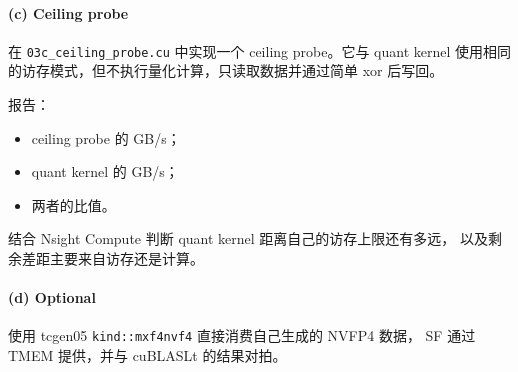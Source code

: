 \documentclass[11pt,a4paper,fontset=fandol]{ctexart}
\providecommand{\tightlist}{\setlength{\itemsep}{0pt}\setlength{\parskip}{0pt}}
\begin{document}
\paragraph{(c) Ceiling probe}\label{c-ceiling-probe}

在
\texttt{03c\_\allowbreak{}ceiling\_\allowbreak{}probe.\allowbreak{}cu}
中实现一个 ceiling probe。它与 quant kernel
使用相同的访存模式，但不执行量化计算，只读取数据并通过简单 xor 后写回。

报告：

\begin{itemize}
\tightlist
\item
  ceiling probe 的 GB/s；
\item
  quant kernel 的 GB/s；
\item
  两者的比值。
\end{itemize}

结合 Nsight Compute 判断 quant kernel 距离自己的访存上限还有多远，
以及剩余差距主要来自访存还是计算。

\paragraph{(d) Optional}\label{d-optional}

使用 tcgen05 \texttt{kind:\allowbreak{}:\allowbreak{}mxf4nvf4}
直接消费自己生成的 NVFP4 数据， SF 通过 TMEM 提供，并与 cuBLASLt
的结果对拍。
\end{document}
